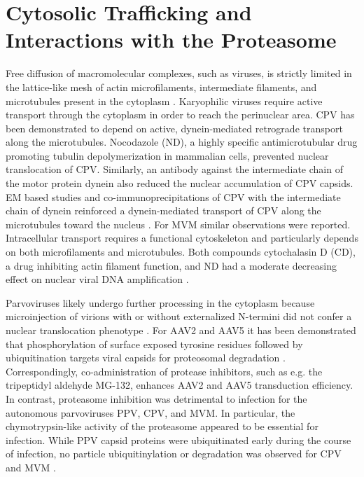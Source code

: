 
    
\section{Cytosolic Trafficking and Interactions with the Proteasome}
Free diffusion of macromolecular complexes, such as viruses, is strictly limited in the lattice-like mesh of actin microfilaments, intermediate filaments, and microtubules present in the cytoplasm \cite{pmid10553280, pmid9214387}. Karyophilic viruses require active transport through the cytoplasm in order to reach the perinuclear area. CPV has been demonstrated to depend on active, dynein-mediated retrograde transport along the microtubules. Nocodazole (ND), a highly specific antimicrotubular drug promoting tubulin depolymerization in mammalian cells, prevented nuclear translocation of CPV. Similarly, an antibody against the intermediate chain of the motor protein dynein also reduced the nuclear accumulation of CPV capsids. EM based studies and co-immunoprecipitations of CPV with the intermediate chain of dynein reinforced a dynein-mediated transport of CPV along the microtubules toward the nucleus \cite{pmid12970411, pmid11932407, pmid10775624}. For MVM similar observations were reported. Intracellular transport requires a functional cytoskeleton and particularly depends on both microfilaments and microtubules. Both compounds cytochalasin D (CD), a drug inhibiting actin filament function, and ND had a moderate decreasing effect on nuclear viral DNA amplification \cite{pmid12438589}.  


Parvoviruses likely undergo further processing in the cytoplasm because microinjection of virions with or without externalized N-termini did not confer a nuclear translocation phenotype \cite{pmid10644365, pmid16956943, pmid14644609, pmid11932407}. For AAV2 and AAV5 it has been demonstrated that phosphorylation of surface exposed tyrosine residues followed by ubiquitination targets viral capsids for proteosomal degradation \cite{pmid11836382, pmid18834608, pmid18511559}. Correspondingly, co-administration of protease inhibitors, such as e.g. the tripeptidyl aldehyde MG-132, enhances AAV2 and AAV5 transduction efficiency. In contrast, proteasome inhibition was detrimental to infection for the autonomous parvoviruses PPV, CPV, and MVM. In particular, the chymotrypsin-like activity of the proteasome appeared to be essential for infection. While PPV capsid proteins were ubiquitinated early during the course of infection, no particle ubiquitinylation or degradation was observed for CPV and MVM \cite{pmid20484503, pmid12438589, pmid15207621}.

